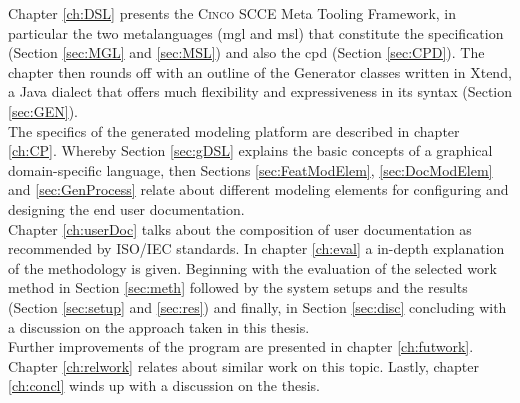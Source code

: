 Chapter \ref{ch:DSL} presents the \textsc{Cinco} SCCE Meta Tooling Framework, in particular the two metalanguages (\acrfull{mgl} and \acrfull{msl}) that constitute the specification (Section \ref{sec:MGL} and \ref{sec:MSL}) and also the \acrfull{cpd} (Section \ref{sec:CPD}). The chapter then rounds off with an outline of the Generator classes written in Xtend, a Java dialect that offers much flexibility and expressiveness in its syntax (Section \ref{sec:GEN}).\\The specifics of the generated modeling platform are described in chapter \ref{ch:CP}. Whereby Section \ref{sec:gDSL} explains the basic concepts of a graphical domain-specific language, then Sections \ref{sec:FeatModElem}, \ref{sec:DocModElem} and \ref{sec:GenProcess} relate about different modeling elements for configuring and designing the end user documentation.\\Chapter \ref{ch:userDoc} talks about the composition of user documentation as recommended by ISO/IEC standards. In chapter \ref{ch:eval} a in-depth explanation of the methodology is given. Beginning with the evaluation of the selected work method in Section \ref{sec:meth} followed by the system setups and the results (Section \ref{sec:setup} and \ref{sec:res}) and finally, in Section \ref{sec:disc} concluding with a discussion on the approach taken in this thesis.\\
Further improvements of the program are presented in chapter \ref{ch:futwork}. Chapter \ref{ch:relwork} relates about similar work on this topic. Lastly, chapter \ref{ch:concl} winds up with a discussion on the thesis.